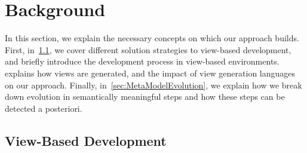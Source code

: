 \section{Background}
\label{sec:Background}


In this section, we explain the necessary concepts on which our approach builds.
First, in~\cref{sec:ViewBasedDevelopment}, we cover different solution strategies to view-based development, and briefly introduce the development process in view-based environments.
 explains how views are generated, and the impact of view generation languages on our approach.
Finally, in~\cref{sec:MetaModelEvolution}, we explain how we break down \metamodel evolution in semantically meaningful steps and how these steps can be detected a posteriori.


\subsection{View-Based Development}
\label{sec:ViewBasedDevelopment}


